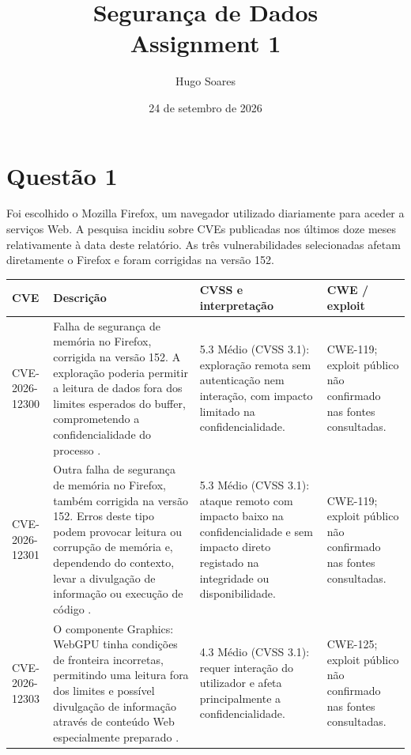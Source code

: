 \documentclass[11pt,a4paper]{article}
\title{Segurança de Dados\\\large Assignment 1}
\author{Hugo Soares}
\date{24 de setembro de 2026}
\begin{document}
\maketitle

\section*{Questão 1}

Foi escolhido o Mozilla Firefox, um navegador utilizado diariamente para aceder a serviços Web. A pesquisa incidiu sobre CVEs publicadas nos últimos doze meses relativamente à data deste relatório. As três vulnerabilidades selecionadas afetam diretamente o Firefox e foram corrigidas na versão 152.

\begin{center}
\small
\begin{tabularx}{\textwidth}{p{2.2cm}X p{2.1cm} p{2.1cm}}
\toprule
\textbf{CVE} & \textbf{Descrição} & \textbf{CVSS e interpretação} & \textbf{CWE / exploit} \\
\midrule
CVE-2026-12300 & Falha de segurança de memória no Firefox, corrigida na versão 152. A exploração poderia permitir a leitura de dados fora dos limites esperados do buffer, comprometendo a confidencialidade do processo \cite{cve12300}. & 5.3 Médio (CVSS 3.1): exploração remota sem autenticação nem interação, com impacto limitado na confidencialidade. & CWE-119; exploit público não confirmado nas fontes consultadas. \\
CVE-2026-12301 & Outra falha de segurança de memória no Firefox, também corrigida na versão 152. Erros deste tipo podem provocar leitura ou corrupção de memória e, dependendo do contexto, levar a divulgação de informação ou execução de código \cite{cve12301}. & 5.3 Médio (CVSS 3.1): ataque remoto com impacto baixo na confidencialidade e sem impacto direto registado na integridade ou disponibilidade. & CWE-119; exploit público não confirmado nas fontes consultadas. \\
CVE-2026-12303 & O componente Graphics: WebGPU tinha condições de fronteira incorretas, permitindo uma leitura fora dos limites e possível divulgação de informação através de conteúdo Web especialmente preparado \cite{cve12303}. & 4.3 Médio (CVSS 3.1): requer interação do utilizador e afeta principalmente a confidencialidade. & CWE-125; exploit público não confirmado nas fontes consultadas. \\
\bottomrule
\end{tabularx}
\end{center}
\end{document}

